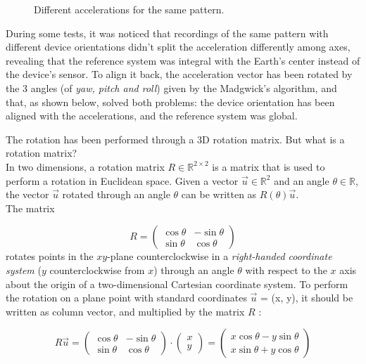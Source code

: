 \begin{center}
	\begin{figure}[ht!]
		\caption{Different accelerations for the same pattern.}
	\end{figure}
\end{center}

During some tests, it was noticed that recordings of the same pattern with different device orientations didn't split the acceleration differently among axes, revealing that the reference system was integral with the Earth's center instead of the device's sensor. To align it back, the acceleration vector has been rotated by the 3 angles (of \textit{yaw, pitch and roll}) given by the Madgwick's algorithm, and that, as shown below, solved both problems: the device orientation has been aligned with the accelerations, and the reference system was global.
\bigbreak

The rotation has been performed through a 3D rotation matrix. But what is a rotation matrix?\\
In two dimensions, a rotation matrix $R \in \mathbb R^{2 \times 2}$ is a matrix that is used to perform a rotation in Euclidean space. Given a vector $\vec u \in \mathbb R^2$ and an angle $\theta \in \mathbb R$, the vector $\vec u$ rotated through an angle $\theta$ can be written as $R(\theta) \vec u$.\\
The matrix

\[
	R =
	{\begin{pmatrix}
		\cos \theta & -\sin \theta \\
		\sin \theta & \cos \theta
	\end{pmatrix}}
\]
rotates points in the $xy$-plane counterclockwise in a \textit{right-handed coordinate system} ($y$ counterclockwise from $x$) through an angle $\theta$ with respect to the $x$ axis about the origin of a two-dimensional Cartesian coordinate system. To perform the rotation on a plane point with standard coordinates $\vec u$ = (x, y), it should be written as column vector, and multiplied by the matrix $R$ \cite{WikipediaRotationM}:
\bigbreak

\[
	R \vec u =
	{\begin{pmatrix}
		\cos \theta &-\sin \theta \\
		\sin \theta &\cos \theta
	\end{pmatrix}}
	\cdot
	{\begin{pmatrix}
		x \\
		y
	\end{pmatrix}} =
	{\begin{pmatrix}
		x\cos \theta -y\sin \theta \\
		x\sin \theta +y\cos \theta
	\end{pmatrix}}
\]
\bigbreak


